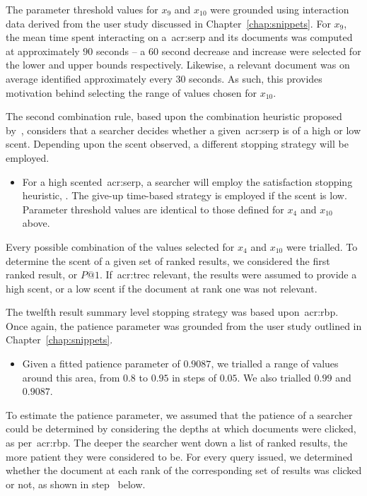 The parameter threshold values for $x_9$ and $x_{10}$ were grounded using interaction data derived from the user study discussed in Chapter~\ref{chap:snippets}. For $x_9$, the mean time spent interacting on a~\gls{acr:serp} and its documents was computed at approximately $90$ seconds -- a $60$ second decrease and increase were selected for the lower and upper bounds respectively. Likewise, a relevant document was on average identified approximately every $30$ seconds. As such, this provides motivation behind selecting the range of values chosen for $x_{10}$.

The second combination rule, based upon the combination heuristic proposed by~\cite{mcnair1982gut_mvt}, considers that a searcher decides whether a given~\gls{acr:serp} is of a high or low scent. Depending upon the scent observed, a different stopping strategy will be employed.

\begin{itemize}
    \item{ For a high scented~\gls{acr:serp}, a searcher will employ the satisfaction stopping heuristic, . The give-up time-based strategy  is employed if the scent is low. Parameter threshold values are identical to those defined for $x_4$ and $x_{10}$ above.}
\end{itemize}

Every possible combination of the values selected for $x_4$ and $x_{10}$ were trialled. To determine the scent of a given set of ranked results, we considered the first ranked result, or $P@1$. If~\gls{acr:trec} relevant, the results were assumed to provide a high scent, or a low scent if the document at rank one was not relevant.

The twelfth result summary level stopping strategy was based upon~\gls{acr:rbp}. Once again, the patience parameter was grounded from the user study outlined in Chapter~\ref{chap:snippets}.

\begin{itemize}
    \item{ Given a fitted patience parameter of $0.9087$, we trialled a range of values around this area, from $0.8$ to $0.95$ in steps of $0.05$. We also trialled $0.99$ and $0.9087$.}
\end{itemize}

To estimate the patience parameter, we assumed that the patience of a searcher could be determined by considering the depths at which documents were clicked, as per~\gls{acr:rbp}. The deeper the searcher went down a list of ranked results, the more patient they were considered to be. For every query issued, we determined whether the document at each rank of the corresponding set of results was clicked or not, as shown in step~ below.

